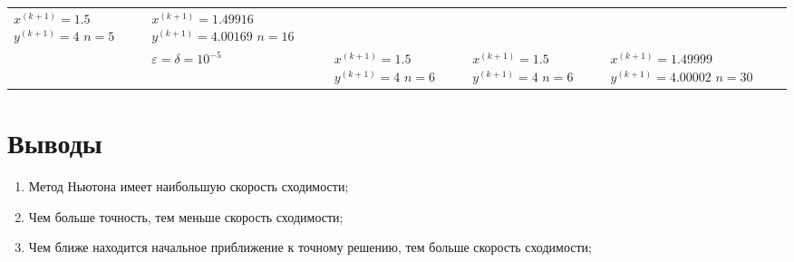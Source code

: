 \begin{table}[h!]
\begin{tabular}{|p{12ex}|l|p{20ex}|p{20ex}|p{20ex}|}
		\(x^{(k+1)}=1.5\) \newline \(y^{(k+1)}=4\) \newline\(n=5\) &                                                                                                               %
		\(x^{(k+1)}=1.49916\) \newline \(y^{(k+1)}=4.00169\) \newline\(n=16\)                                                                                                       \\ \cline{2-5}
		                                                           & \(\varepsilon = \delta = 10^{-5} \) &                                                                         %
		\(x^{(k+1)}=1.5\) \newline \(y^{(k+1)}=4\) \newline\(n=6\) &                                                                                                               %
		\(x^{(k+1)}=1.5\) \newline \(y^{(k+1)}=4\) \newline\(n=6\) &                                                                                                               %
		\(x^{(k+1)}=1.49999\) \newline \(y^{(k+1)}=4.00002\) \newline\(n=30\)                                                                                                                 \\ \hline
	\end{tabular}
\end{table}


\section{Выводы}
\begin{enumerate}
	\item Метод Ньютона имеет наибольшую скорость сходимости;
	\item Чем больше точность, тем меньше скорость сходимости;
	\item Чем ближе находится начальное приближение к точному решению, тем больше скорость сходимости;
\end{enumerate}
